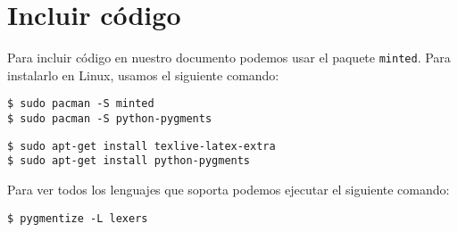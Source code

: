 \documentclass[a4paper]{article}
\begin{document}
\section{Incluir código}

Para incluir código en nuestro documento podemos usar el paquete \texttt{minted}. Para instalarlo en Linux, usamos el siguiente comando:


\begin{verbatim}
$ sudo pacman -S minted
$ sudo pacman -S python-pygments
\end{verbatim}

\begin{verbatim}
$ sudo apt-get install texlive-latex-extra
$ sudo apt-get install python-pygments
\end{verbatim}


Para ver todos los lenguajes que soporta podemos ejecutar el siguiente comando:

\begin{verbatim}
$ pygmentize -L lexers
\end{verbatim}
\end{document}
